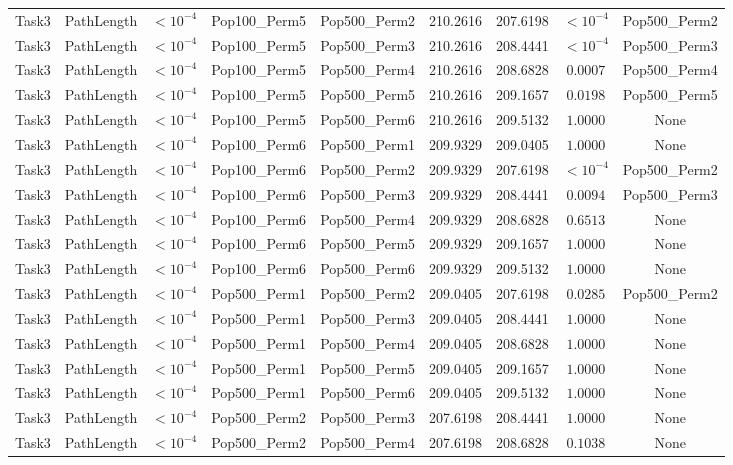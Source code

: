 \documentclass[8pt]{article}
\begin{document}
\begin{longtable}{llccccccc}
Task3 & PathLength & $< 10^{-4}$ & Pop100\_Perm5 & Pop500\_Perm2 & 210.2616 & 207.6198 & $< 10^{-4}$ & Pop500\_Perm2 \\
Task3 & PathLength & $< 10^{-4}$ & Pop100\_Perm5 & Pop500\_Perm3 & 210.2616 & 208.4441 & $< 10^{-4}$ & Pop500\_Perm3 \\
Task3 & PathLength & $< 10^{-4}$ & Pop100\_Perm5 & Pop500\_Perm4 & 210.2616 & 208.6828 & $0.0007$ & Pop500\_Perm4 \\
Task3 & PathLength & $< 10^{-4}$ & Pop100\_Perm5 & Pop500\_Perm5 & 210.2616 & 209.1657 & $0.0198$ & Pop500\_Perm5 \\
Task3 & PathLength & $< 10^{-4}$ & Pop100\_Perm5 & Pop500\_Perm6 & 210.2616 & 209.5132 & $1.0000$ & None \\
Task3 & PathLength & $< 10^{-4}$ & Pop100\_Perm6 & Pop500\_Perm1 & 209.9329 & 209.0405 & $1.0000$ & None \\
Task3 & PathLength & $< 10^{-4}$ & Pop100\_Perm6 & Pop500\_Perm2 & 209.9329 & 207.6198 & $< 10^{-4}$ & Pop500\_Perm2 \\
Task3 & PathLength & $< 10^{-4}$ & Pop100\_Perm6 & Pop500\_Perm3 & 209.9329 & 208.4441 & $0.0094$ & Pop500\_Perm3 \\
Task3 & PathLength & $< 10^{-4}$ & Pop100\_Perm6 & Pop500\_Perm4 & 209.9329 & 208.6828 & $0.6513$ & None \\
Task3 & PathLength & $< 10^{-4}$ & Pop100\_Perm6 & Pop500\_Perm5 & 209.9329 & 209.1657 & $1.0000$ & None \\
Task3 & PathLength & $< 10^{-4}$ & Pop100\_Perm6 & Pop500\_Perm6 & 209.9329 & 209.5132 & $1.0000$ & None \\
Task3 & PathLength & $< 10^{-4}$ & Pop500\_Perm1 & Pop500\_Perm2 & 209.0405 & 207.6198 & $0.0285$ & Pop500\_Perm2 \\
Task3 & PathLength & $< 10^{-4}$ & Pop500\_Perm1 & Pop500\_Perm3 & 209.0405 & 208.4441 & $1.0000$ & None \\
Task3 & PathLength & $< 10^{-4}$ & Pop500\_Perm1 & Pop500\_Perm4 & 209.0405 & 208.6828 & $1.0000$ & None \\
Task3 & PathLength & $< 10^{-4}$ & Pop500\_Perm1 & Pop500\_Perm5 & 209.0405 & 209.1657 & $1.0000$ & None \\
Task3 & PathLength & $< 10^{-4}$ & Pop500\_Perm1 & Pop500\_Perm6 & 209.0405 & 209.5132 & $1.0000$ & None \\
Task3 & PathLength & $< 10^{-4}$ & Pop500\_Perm2 & Pop500\_Perm3 & 207.6198 & 208.4441 & $1.0000$ & None \\
Task3 & PathLength & $< 10^{-4}$ & Pop500\_Perm2 & Pop500\_Perm4 & 207.6198 & 208.6828 & $0.1038$ & None \\

\end{longtable}
\end{document}
